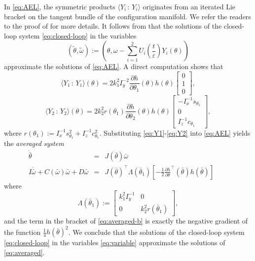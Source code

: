 \documentclass{ifacconf}
\begin{document}
In \eqref{eq:AEL}, the symmetric products $\langle Y_i{\,:\,}Y_i\rangle$ originates from an iterated
Lie bracket on the tangent bundle of the configuration manifold. We refer the readers to the proof of \cite[Theorem 2]{wang2023underactuated} for more details. It follows from \cite{bullo2002averaging,wang2023underactuated} that the solutions of the closed-loop system \eqref{eq:closed-loop} in the variables
\begin{equation}\label{eq:variable}
    \left(\tilde{\theta},\tilde{\omega}\right):=\left(\theta,\omega-\sum_{i=1}^2 U_i\left(\frac{t}{\varepsilon}\right)Y_i(\theta) \right)
\end{equation}
approximate the solutions of \eqref{eq:AEL}. A direct computation shows that
\begin{equation}\label{eq:Y1}
    \langle Y_1{\,:\,}Y_1 \rangle (\theta) = 2 k_1^2 I_y^{-2}  \frac{\partial h}{\partial \theta_1}(\theta) h(\theta) \begin{bmatrix}
        0 \\ 1 \\ 0
    \end{bmatrix},
\end{equation}
\begin{equation}\label{eq:Y2}
    \langle Y_2{\,:\,}Y_2 \rangle (\theta)=2k_2^2r(\theta_1) \frac{\partial h}{\partial \theta_2} (\theta)h(\theta)\begin{bmatrix}
       -I_x^{-1}s_{\theta_1} \\ 0 \\I_z^{-1}c_{\theta_1}
    \end{bmatrix},
\end{equation}
where $r(\theta_1):=I_x^{-1}s_{\theta_1}^2+I_z^{-1}c_{\theta_1}^2$. Substituting \eqref{eq:Y1}-\eqref{eq:Y2} into \eqref{eq:AEL} yields the \textit{averaged system}
\begin{subequations}
  \label{eq:averaged}
  \begin{eqnarray}
       \dot{\bar{\theta}} &=&J(\bar{\theta})\bar{\omega}  \label{eq:averaged-a}\\
       I\dot{\bar{\omega}}+C(\bar{\omega})\bar{\omega} + D\bar{\omega}&=& J(\bar{\theta})^\top \Lambda(\bar{\theta}_1)\left[-\frac{1}{2}\frac{\partial h}{\partial \theta}^\top(\bar{\theta}) h(\bar{\theta})\right] \quad\quad\label{eq:averaged-b}
  \end{eqnarray}
\end{subequations}
where
\begin{equation}
    \Lambda(\bar{\theta}_1):=\begin{bmatrix}
        k_1^2I_y^{-1} &  0 \\
         0 &  k_2^2 r(\bar{\theta}_1)
    \end{bmatrix},
\end{equation}
and the term in the bracket of \eqref{eq:averaged-b} is exactly the negative gradient of the
function $\frac{1}{4}h(\bar{\theta})^2$. We conclude that the solutions of the closed-loop system \eqref{eq:closed-loop} in the variables \eqref{eq:variable} approximate the solutions of \eqref{eq:averaged}.
\end{document}
